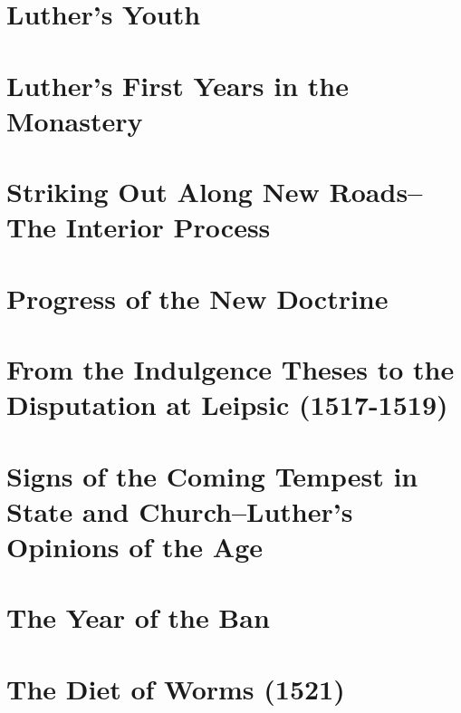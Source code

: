 \chapter{Luther’s Youth}




\chapter{Luther's First Years in the Monastery}




\chapter{Striking Out Along New Roads--The Interior Process}



\chapter{Progress of the New Doctrine}





\chapter{From the Indulgence Theses to the Disputation at Leipsic (1517-1519)}



\chapter{Signs of the Coming Tempest in State and Church--Luther’s Opinions of the Age}




\chapter{The Year of the Ban}





\chapter{The Diet of Worms (1521)}



